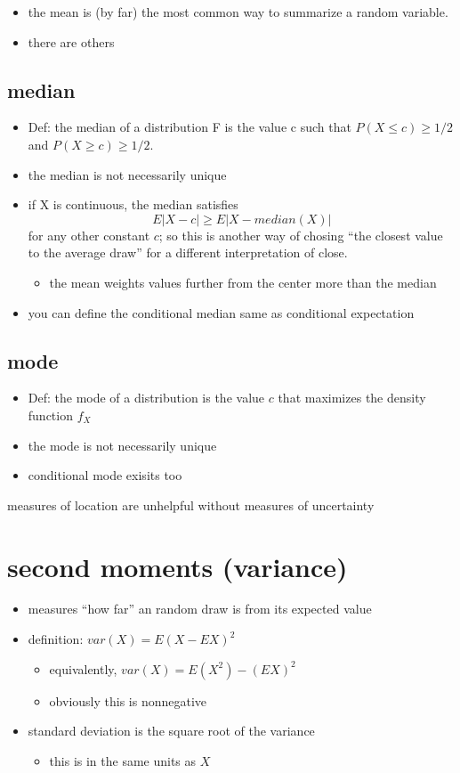 \begin{itemize}
\item the mean is (by far) the most common way to summarize a random variable.
\item there are others
\end{itemize}
\subsection{median}
\label{sec-2-1}

\begin{itemize}
\item Def: the median of a distribution F is the value c such that $P(X
       \leq c) \geq 1/2$ and $P(X \geq c) \geq 1/2$.
\item the median is not necessarily unique
\item if X is continuous, the median satisfies 
       \[ E | X - c | \geq E | X - median(X) | \]
       for any other constant $c$; so this is another way of chosing
       ``the closest value to the average draw'' for a different
       interpretation of close.
\begin{itemize}
\item the mean weights values further from the center more than
         the median
\end{itemize}
\item you can define the conditional median same as conditional expectation
\end{itemize}
\subsection{mode}
\label{sec-2-2}

\begin{itemize}
\item Def: the mode of a distribution is the value $c$ that maximizes
       the density function $f_X$
\item the mode is not necessarily unique
\item conditional mode exisits too
\end{itemize}
     measures of location are unhelpful without measures of uncertainty
\section{second moments (variance)}
\label{sec-3}

\begin{itemize}
\item measures ``how far'' an random draw is from its expected value
\item definition: $var(X) = E(X - E X)^2$
\begin{itemize}
\item equivalently, $var(X) = E(X^2) - (EX)^2$
\item obviously this is nonnegative
\end{itemize}
\item standard deviation is the square root of the variance
\begin{itemize}
\item this is in the same units as $X$
\end{itemize}
\end{itemize}
